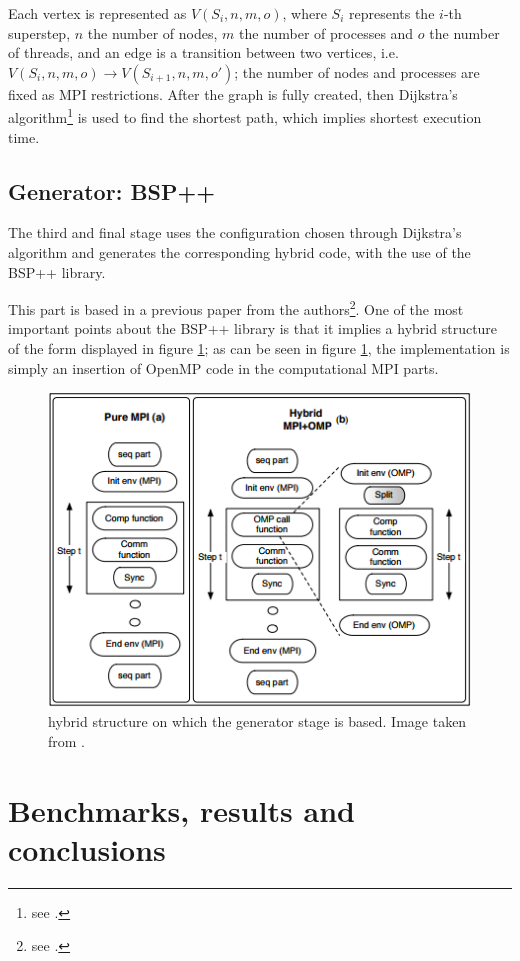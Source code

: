 \documentclass[paper=a4, fontsize=11pt]{scrartcl} %
\numberwithin{equation}{section} %
\numberwithin{figure}{section} %
\numberwithin{table}{section} %
\begin{document}
Each vertex is represented as $V(S_{i}, n, m, o)$, where $S_{i}$ represents the $i$-th superstep, $n$ the number of nodes, $m$ the number of processes and $o$ the number of threads, and an edge is a transition between two vertices, i.e. $V(S_{i}, n, m, o) \rightarrow V(S_{i+1}, n, m, o')$; the number of nodes and processes are fixed as MPI restrictions. After the graph is fully created, then Dijkstra's algorithm\footnote{see \cite{dijkstra}.} is used to find the shortest path, which implies shortest execution time.


\subsection{Generator: BSP++}

The third and final stage uses the configuration chosen through Dijkstra's algorithm and generates the corresponding hybrid code, with the use of the BSP++ library.

This part is based in a previous paper from the authors\footnote{see \cite{hamidouche2}.}. One of the most important points about the BSP++ library is that it implies a hybrid structure of the form displayed in figure \ref{fig:hybrid-structure}; as can be seen in figure \ref{fig:hybrid-structure}, the implementation is simply an insertion of OpenMP code in the computational MPI parts.

\begin{figure}
\centering
\includegraphics[width=0.8\linewidth]{generator-hybrid-struct.png}
\caption{hybrid structure on which the generator stage is based. Image taken from \cite{hamidouche}.} \label{fig:hybrid-structure}
\end{figure}


\section{Benchmarks, results and conclusions}
\end{document}
